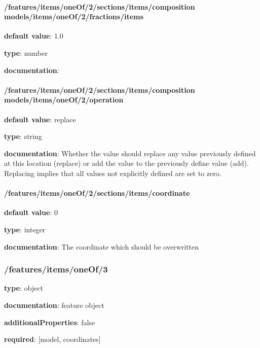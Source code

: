 \begin{itemized}
\paragraph{/features/items/oneOf/2/sections/items/composition models/items/oneOf/2/fractions/items} \begin{itemized}
\item {\bf default value}: 1.0
\item {\bf type}: number
\item {\bf documentation}: 
\end{itemized}\end{itemized}\paragraph{/features/items/oneOf/2/sections/items/composition models/items/oneOf/2/operation} \begin{itemized}
\item {\bf default value}: replace
\item {\bf type}: string
\item {\bf documentation}: Whether the value should replace any value previously defined at this location (replace) or add the value to the previously define value (add). Replacing implies that all values not explicitly defined are set to zero.
\end{itemized}\paragraph{/features/items/oneOf/2/sections/items/coordinate} \begin{itemized}
\item {\bf default value}: 0
\item {\bf type}: integer
\item {\bf documentation}: The coordinate which should be overwritten
\end{itemized}\subsubsection{/features/items/oneOf/3} \begin{itemized}
\item {\bf type}: object
\item {\bf documentation}: feature object
\item {\bf additionalProperties}: false
\item {\bf required}: [model, coordinates]\end{itemized}
